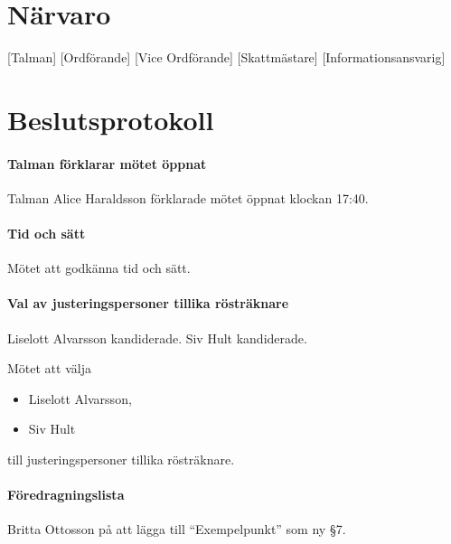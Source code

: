 \documentclass{dsekminutes}
\begin{document}
\maketitle

\section*{Närvaro}
\begin{attendance}
  [Talman]
  [Ordförande]
  [Vice Ordförande]
  [Skattmästare]
  [Informationsansvarig]
\end{attendance}

\section*{Beslutsprotokoll}

\paragraph{Talman förklarar mötet öppnat}
Talman Alice Haraldsson förklarade mötet öppnat klockan 17:40.

\paragraph{Tid och sätt}
Mötet  att godkänna tid och sätt.

\paragraph{Val av justeringspersoner tillika rösträknare}
Liselott Alvarsson kandiderade.  Siv Hult kandiderade.

Mötet  att välja
\begin{itemize}
\item Liselott Alvarsson,
\item Siv Hult
\end{itemize}
till justeringspersoner tillika rösträknare.

\paragraph{Föredragningslista}
Britta Ottosson \yrkade på att lägga till ``Exempelpunkt''
som ny §7.
\end{document}
